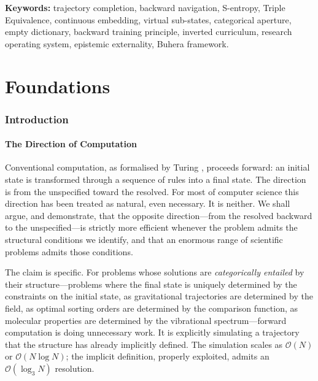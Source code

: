 \documentclass[twocolumn,11pt,a4paper]{article}
\begin{document}
\begin{abstract}
theorem has a corresponding executable validation script; results are persisted as JSON and reproducible in under one second total runtime. This is not an argument against any existing framework. This is the integrated statement of a framework whose central mechanism---start at the fully-resolved state and navigate backward to constrained projections---spans computation ($\mathcal{O}(\log_3 N)$ vs $\mathcal{O}(N)$), learning ($(N+1)\times$ to $2^{N-1}\times$ sample saving), and epistemology (structural preparation without content).
\end{abstract}

\noindent\textbf{Keywords:} trajectory completion, backward navigation, S-entropy, Triple Equivalence, continuous embedding, virtual sub-states, categorical aperture, empty dictionary, backward training principle, inverted curriculum, research operating system, epistemic externality, Buhera framework.

\tableofcontents


\part{Foundations}

\section{Introduction}
\label{sec:introduction}

\subsection{The Direction of Computation}

Conventional computation, as formalised by Turing \cite{turing1936computable}, proceeds forward: an initial state is transformed through a sequence of rules into a final state. The direction is from the unspecified toward the resolved. For most of computer science this direction has been treated as natural, even necessary. It is neither. We shall argue, and demonstrate, that the opposite direction---from the resolved backward to the unspecified---is strictly more efficient whenever the problem admits the structural conditions we identify, and that an enormous range of scientific problems admits those conditions.

The claim is specific. For problems whose solutions are \emph{categorically entailed} by their structure---problems where the final state is uniquely determined by the constraints on the initial state, as gravitational trajectories are determined by the field, as optimal sorting orders are determined by the comparison function, as molecular properties are determined by the vibrational spectrum---forward computation is doing unnecessary work. It is explicitly simulating a trajectory that the structure has already implicitly defined. The simulation scales as $\mathcal{O}(N)$ or $\mathcal{O}(N \log N)$; the implicit definition, properly exploited, admits an $\mathcal{O}(\log_3 N)$ resolution.
\end{document}
